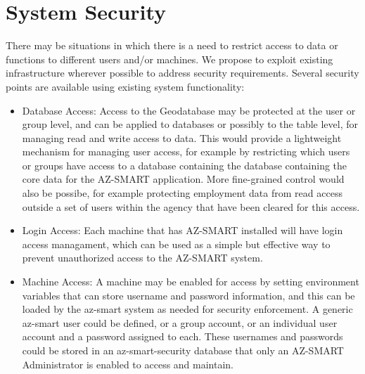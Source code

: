 \section{System Security}
There may be situations in which there is a need to restrict access
to data or functions to different users and/or machines.  We propose
to exploit existing infrastructure wherever possible to address
security requirements.  Several security points are available using
existing system functionality:


\begin{itemize}
\item Database Access: Access to the Geodatabase may be protected
at the user or group level, and can be applied to databases or
possibly to the table level, for managing read and write access
to data.  This would provide a lightweight mechanism for managing
user access, for example by restricting which users or groups
have access to a database containing the database containing the
core data for the AZ-SMART application.  More fine-grained control
would also be possibe, for example protecting employment data from
read access outside a set of users within the agency that have
been cleared for this access.

\item Login Access: Each machine that has AZ-SMART installed will
have login access managament, which can be used as a simple but
effective way to prevent unauthorized access to the AZ-SMART system.

\item Machine Access: A machine may be enabled for access by setting
environment variables that can store username and password information,
and this can be loaded by the az-smart system as needed for security
enforcement.  A generic az-smart user could be defined, or a group
account, or an individual user account and a password assigned to
each.  These usernames and passwords could be stored in an
az-smart-security database that only an AZ-SMART Administrator is
enabled to access and maintain.

\end{itemize}
